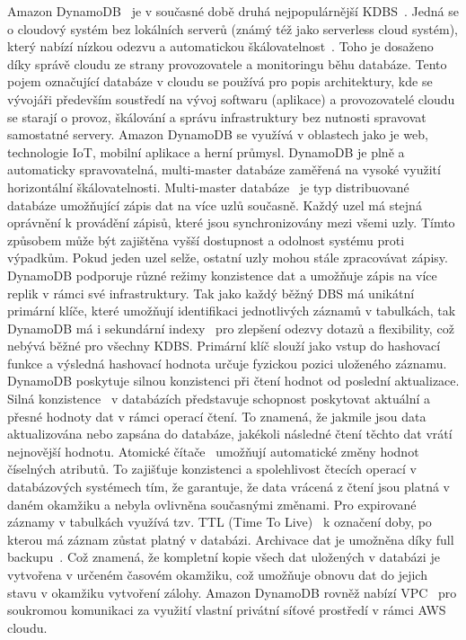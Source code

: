 \documentclass[czech,master,dept460,male,csharp,cpdeclaration]{diploma}
\begin{document}
	Amazon DynamoDB~\cite{dynamodb} je v současné době druhá nejpopulárnější KDBS~\cite{dynamodb-dbengines-rank2}. Jedná se o cloudový systém bez lokálních serverů (známý též jako serverless cloud systém), který nabízí nízkou odezvu a automatickou škálovatelnost~\cite{dynamodb-autoscaling}. Toho je dosaženo díky správě cloudu ze strany provozovatele a monitoringu běhu databáze. Tento pojem označující databáze v cloudu se používá pro popis architektury, kde se vývojáři především soustředí na vývoj softwaru (aplikace) a provozovatelé cloudu se starají o provoz, škálování a správu infrastruktury bez nutnosti spravovat samostatné servery. Amazon DynamoDB se využívá v oblastech jako je web, technologie IoT, mobilní aplikace a herní průmysl. DynamoDB je plně a automaticky spravovatelná, multi-master databáze zaměřená na vysoké využití horizontální škálovatelnosti. Multi-master databáze~\cite{postgres-multimaster-replication} je typ distribuované databáze umožňující zápis dat na více uzlů současně. Každý uzel má stejná oprávnění k provádění zápisů, které jsou synchronizovány mezi všemi uzly. Tímto způsobem může být zajištěna vyšší dostupnost a odolnost systému proti výpadkům. Pokud jeden uzel selže, ostatní uzly mohou stále zpracovávat zápisy. DynamoDB podporuje různé režimy konzistence dat a umožňuje zápis na více replik v rámci své infrastruktury. Tak jako každý běžný DBS má unikátní primární klíče, které umožňují identifikaci jednotlivých záznamů v tabulkách, tak DynamoDB má i sekundární indexy~\cite{dynamodb-secondary-index} pro zlepšení odezvy dotazů a flexibility, což nebývá běžné pro všechny KDBS. Primární klíč slouží jako vstup do hashovací funkce a výsledná hashovací hodnota určuje fyzickou pozici uloženého záznamu. DynamoDB poskytuje silnou konzistenci při čtení hodnot od poslední aktualizace. Silná konzistence~\cite{strong-consistency} v databázích představuje schopnost poskytovat aktuální a přesné hodnoty dat v rámci operací čtení. To znamená, že jakmile jsou data aktualizována nebo zapsána do databáze, jakékoli následné čtení těchto dat vrátí nejnovější hodnotu. Atomické čítače~\cite{atomic-counter} umožňují automatické změny hodnot číselných atributů. To zajišťuje konzistenci a spolehlivost čtecích operací v databázových systémech tím, že garantuje, že data vrácená z čtení jsou platná v daném okamžiku a nebyla ovlivněna současnými změnami. Pro expirované záznamy v tabulkách využívá tzv. TTL (Time To Live)~\cite{ttl} k označení doby, po kterou má záznam zůstat platný v databázi. Archivace dat je umožněna díky full backupu~\cite{full-backup}. Což znamená, že kompletní kopie všech dat uložených v databázi je vytvořena v určeném časovém okamžiku, což umožňuje obnovu dat do jejich stavu v okamžiku vytvoření zálohy. Amazon DynamoDB rovněž nabízí VPC~\cite{vpc} pro soukromou komunikaci za využití vlastní privátní síťové prostředí v rámci AWS cloudu.
	
\end{document}
